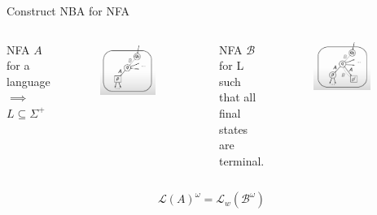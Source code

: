 \documentclass[14pts]{beamer}
\begin{document}
    \begin{frame}{Construct NBA for NFA}
      \begin{columns}
        NFA $A$ for a language $\implies$ \\ $L \subseteq \Sigma^{+}$
        \begin{figure}
          \centering
          \includegraphics[width=0.8\textwidth]{photo5.jpeg}
        \end{figure}
         NFA  $\mathcal{B}$ for L such that all final states are terminal. 
        \begin{figure}
          \centering
          \includegraphics[width=0.8\textwidth]{photo6.jpeg}
        \end{figure}
      \end{columns}
      \[\mathcal{L}(A)^{\omega} = \mathcal{L}_{w}(\mathcal{B}^{\omega})\]
    \end{frame}
\end{document}
